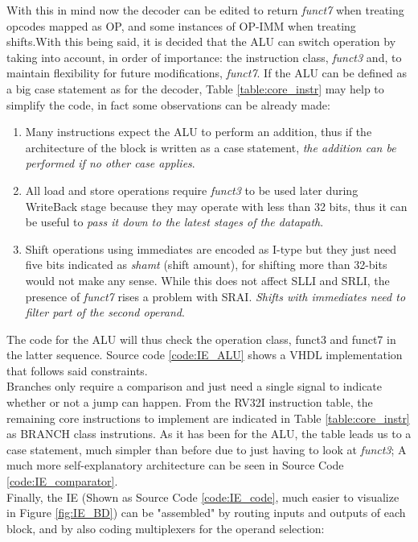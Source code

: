With this in mind now the decoder can be edited to return \emph{funct7} when treating opcodes mapped as OP, and some instances of OP-IMM when treating shifts.With this being said, it is decided that the ALU can switch operation by taking into account, in order of importance: the instruction class, \emph{funct3} and, to maintain flexibility for future modifications, \emph{funct7}.
If the ALU can be defined as a big case statement as for the decoder, Table \ref{table:core_instr} may help to simplify the code, in fact some observations can be already made:
\begin{enumerate}
\item Many instructions expect the ALU to perform an addition, thus if the architecture of the block is written as a case statement, \emph{the addition can be performed if no other case applies}.
\item All load and store operations require \emph{funct3} to be used later during WriteBack stage because they may operate with less than 32 bits, thus it can be useful to \emph{pass it down to the latest stages of the datapath}.
\item Shift operations using immediates are encoded as I-type but they just need five bits indicated as \emph{shamt} (shift amount), for shifting more than 32-bits would not make any sense. While this does not affect SLLI and SRLI, the presence of \emph{funct7} rises a problem with SRAI. \emph{Shifts with immediates need to filter part of the second operand}.
\end{enumerate}
The code for the ALU will thus check the operation class, funct3 and funct7 in the latter sequence. Source code \ref{code:IE_ALU} shows a VHDL implementation that follows said constraints.\\
Branches only require a comparison and just need a single signal to indicate whether or not a jump can happen. From the RV32I instruction table, the remaining core instructions  to implement are indicated in Table \ref{table:core_instr} as BRANCH class instrutions. As it has been for the ALU, the table leads us to a case statement, much simpler than before due to just having to look at \emph{funct3}; A much more self-explanatory architecture can be seen in Source Code \ref{code:IE_comparator}.\\
Finally, the IE (Shown as Source Code \ref{code:IE_code}, much easier to visualize in Figure \ref{fig:IE_BD}) can be "assembled" by routing inputs and outputs of each block, and by also coding multiplexers for the operand selection:

